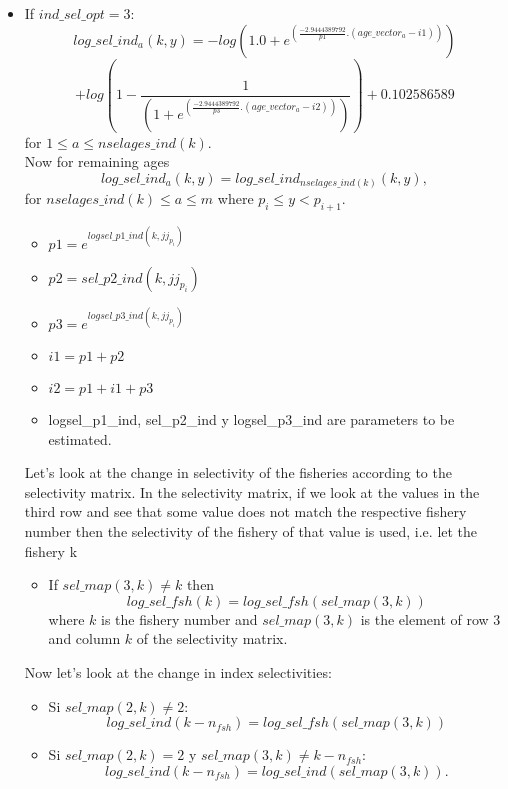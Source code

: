 \documentclass{article}
\begin{document}
\begin{itemize}
    \item If $ind\_sel\_opt=3:$
     \begin{equation}
        log\_sel\_ind_a(k,y)     =  -log(1.0 + e^{(\frac{-2.9444389792}{p1} . ( age\_vector_a - i1) )}) 
\end{equation}
    \begin{equation}
          +log\left(1 - \frac{1}{(1 + e^{(\frac{-2.9444389792}{p3} . ( age\_vector_a - i2))})}  \right)+0.102586589 
    \end{equation}
for $1\leq a \leq nselages\_ind(k).$ \\

    Now for remaining ages
    \begin{equation}
         log\_sel\_ind_a(k,y) = log\_sel\_ind_{nselages\_ind(k)}(k,y),
    \end{equation}
    for $nselages\_ind(k)\leq a \leq m$ where $p_i\leq y < p_{i+1}$.
\begin{itemize}
    \item $p1 = e^{logsel\_p1\_ind(k,jj_{p_i})}$
    \item $p2 = sel\_p2\_ind(k,jj_{p_i})$
    \item $p3 = e^{logsel\_p3\_ind(k,jj_{p_i})}$
    \item $i1 = p1 + p2$
    \item $i2 = p1 + i1 + p3$
    \item logsel\_p1\_ind, sel\_p2\_ind y logsel\_p3\_ind are parameters to be estimated.
\end{itemize}
Let's look at the change in selectivity of the fisheries according to the selectivity matrix.
In the selectivity matrix, if we look at the values in the third row and see that some value does not match the respective fishery number then the selectivity of the fishery of that value is used, i.e. let the fishery k
\begin{itemize}
    \item If $sel\_map(3,k) \neq k$ then
    \begin{equation}
        log\_sel\_fsh(k)=log\_sel\_fsh(sel\_map(3,k))
    \end{equation}
    where $k$ is the fishery number and $sel\_map(3,k)$ 
    is the element of row 3 and column $k$ of the selectivity matrix.
\end{itemize}

Now let's look at the change in index selectivities:
\begin{itemize}
    \item Si $sel\_map(2,k) \neq 2$:
    \begin{equation}
        log\_sel\_ind(k-n_{fsh})=log\_sel\_fsh(sel\_map(3,k))
    \end{equation}
    \item Si $sel\_map(2,k) = 2$ y $sel\_map(3,k) \neq k-n_{fsh}$:
    \begin{equation}
        log\_sel\_ind(k-n_{fsh}) = log\_sel\_ind(sel\_map(3,k)).
    \end{equation}
\end{itemize}

   
\end{itemize}
\end{document}
